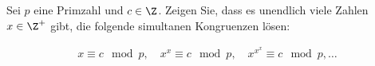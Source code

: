 
\begin{exercise}

Sei $p$ eine Primzahl und $c \in \Z$. Zeigen Sie, dass es unendlich
viele Zahlen $x \in \Z^+$ gibt, die folgende simultanen Kongruenzen lösen:

\begin{align*}
    x \equiv c \mod{p}, \quad x^x \equiv c \mod{p}, \quad x^{x^x} \equiv c \mod p, \dots
\end{align*}

\end{exercise}


\begin{solution}

\phantom{}

\end{solution}

